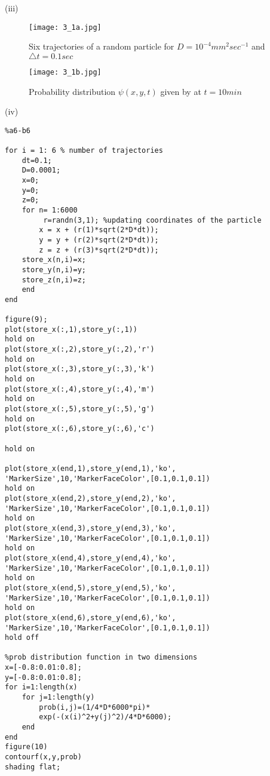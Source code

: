 \documentclass[10 pt]{article}
\begin{document}
\begin{multicols}{2}
\begin{flushleft}
\end{flushleft}
(iii)\begin{flushleft}
\begin{figure}[H]
\texttt{[image: 3\_1a.jpg]}\label{7}
\caption {Six trajectories of a random particle for $D = 10^{-4} mm^2 sec^{-1}$ and $\triangle t = 0.1 sec$}
\end{figure}
\begin{figure}[H]
\texttt{[image: 3\_1b.jpg]}\label{8}
\caption {Probability distribution $\psi (x,y,t)$ given by  at $t = 10 min$ }
\end{figure}
\end{flushleft}
(iv) \begin{flushleft}
\begin{lstlisting}
%a6-b6

for i = 1: 6 % number of trajectories
    dt=0.1;
    D=0.0001;
    x=0;
    y=0;
    z=0;
    for n= 1:6000
         r=randn(3,1); %updating coordinates of the particle
        x = x + (r(1)*sqrt(2*D*dt));
        y = y + (r(2)*sqrt(2*D*dt));
        z = z + (r(3)*sqrt(2*D*dt));
    store_x(n,i)=x;
    store_y(n,i)=y;
    store_z(n,i)=z;
    end
end

figure(9);
plot(store_x(:,1),store_y(:,1))
hold on
plot(store_x(:,2),store_y(:,2),'r')
hold on
plot(store_x(:,3),store_y(:,3),'k')
hold on
plot(store_x(:,4),store_y(:,4),'m')
hold on
plot(store_x(:,5),store_y(:,5),'g')
hold on
plot(store_x(:,6),store_y(:,6),'c')    

hold on

plot(store_x(end,1),store_y(end,1),'ko',
'MarkerSize',10,'MarkerFaceColor',[0.1,0.1,0.1])
hold on
plot(store_x(end,2),store_y(end,2),'ko',
'MarkerSize',10,'MarkerFaceColor',[0.1,0.1,0.1])
hold on
plot(store_x(end,3),store_y(end,3),'ko',
'MarkerSize',10,'MarkerFaceColor',[0.1,0.1,0.1])
hold on
plot(store_x(end,4),store_y(end,4),'ko',
'MarkerSize',10,'MarkerFaceColor',[0.1,0.1,0.1])
hold on
plot(store_x(end,5),store_y(end,5),'ko',
'MarkerSize',10,'MarkerFaceColor',[0.1,0.1,0.1])
hold on
plot(store_x(end,6),store_y(end,6),'ko',
'MarkerSize',10,'MarkerFaceColor',[0.1,0.1,0.1])    
hold off

%prob distribution function in two dimensions
x=[-0.8:0.01:0.8];
y=[-0.8:0.01:0.8];
for i=1:length(x)
    for j=1:length(y)
        prob(i,j)=(1/4*D*6000*pi)*
        exp(-(x(i)^2+y(j)^2)/4*D*6000);
    end
end
figure(10)
contourf(x,y,prob)
shading flat;
\end{lstlisting}
\end{flushleft}

\end{multicols}
\end{document}
